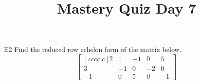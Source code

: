 \documentclass{sbgLAquiz}
\title{Mastery Quiz Day 7 }
\begin{document}
\begin{problem}{E2}
Find the reduced row echelon form of the matrix below.
$$\begin{bmatrix}[cccc|c] 2 & 1 & -1 & 0 & 5 \\ 3 & -1 & 0 & -2 & 0 \\ -1 & 0 & 5 & 0 & -1 \end{bmatrix}$$
\end{problem}
\end{document}
